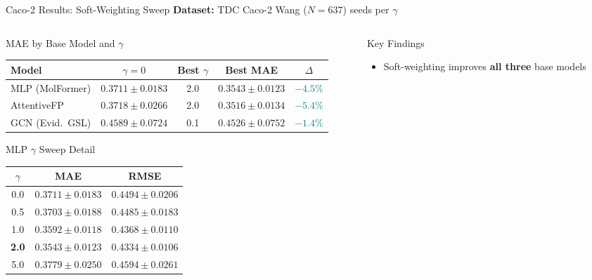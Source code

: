 \documentclass[aspectratio=169]{beamer}
\begin{document}
\begin{frame}[t,shrink=15]{Caco-2 Results: Soft-Weighting Sweep}
\textbf{Dataset:} TDC Caco-2 Wang ($N{=}637$)  seeds per $\gamma$
\vspace{2pt}
\begin{columns}[T]
\begin{column}{0.60\textwidth}
\begin{block}{MAE by Base Model and $\gamma$}
\centering\footnotesize
\renewcommand{\arraystretch}{0.85}
\setlength{\tabcolsep}{3pt}
\begin{tabular}{lcccc}
\toprule
\textbf{Model} & $\gamma{=}0$ & Best $\gamma$ & \textbf{Best MAE} & $\Delta$ \\
\midrule
MLP (MolFormer) & $0.3711{\pm}0.0183$ & 2.0 & $\mathbf{0.3543{\pm}0.0123}$ & \textcolor{teal}{$-4.5\%$} \\
AttentiveFP     & $0.3718{\pm}0.0266$ & 2.0 & $\mathbf{0.3516{\pm}0.0134}$ & \textcolor{teal}{$-5.4\%$} \\
GCN (Evid.~GSL) & $0.4589{\pm}0.0724$ & 0.1 & $0.4526{\pm}0.0752$ & \textcolor{teal}{$-1.4\%$} \\
\bottomrule
\end{tabular}
\end{block}
\begin{block}{MLP $\gamma$ Sweep Detail}
\centering\scriptsize
\renewcommand{\arraystretch}{0.85}
\setlength{\tabcolsep}{3pt}
\begin{tabular}{ccc}
\toprule
$\gamma$ & MAE & RMSE \\
\midrule
0.0 & $0.3711{\pm}0.0183$ & $0.4494{\pm}0.0206$ \\
0.5 & $0.3703{\pm}0.0188$ & $0.4485{\pm}0.0183$ \\
1.0 & $0.3592{\pm}0.0118$ & $0.4368{\pm}0.0110$ \\
\textbf{2.0} & $\mathbf{0.3543{\pm}0.0123}$ & $\mathbf{0.4334{\pm}0.0106}$ \\
5.0 & $0.3779{\pm}0.0250$ & $0.4594{\pm}0.0261$ \\
\bottomrule
\end{tabular}
\end{block}
\end{column}
\begin{column}{0.37\textwidth}
\begin{alertblock}{Key Findings}
\footnotesize
\begin{itemize}
  \item Soft-weighting improves \textbf{all three} base models

\end{itemize}
\end{alertblock}
\end{column}
\end{columns}
\end{frame}
\end{document}
